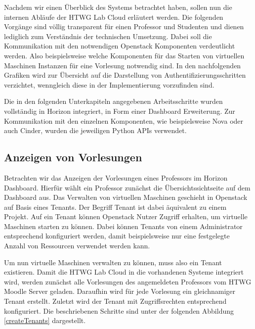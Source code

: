 Nachdem wir einen Überblick des Systems betrachtet haben, sollen nun 
die internen Abläufe der HTWG Lab Cloud erläutert werden. Die folgenden
Vorgänge sind völlig transparent für einen Professor und Studenten und dienen lediglich zum
Verständnis der technischen Umsetzung.
Dabei soll die Kommunikation mit den notwendigen Openstack Komponenten verdeutlicht werden.
Also beispielsweise welche Komponenten für das Starten von virtuellen Maschinen Instanzen 
für eine Vorlesung notwendig sind.
In den nachfolgenden Grafiken wird zur Übersicht auf die Darstellung von
Authentifizierungsschritten verzichtet, wenngleich diese in der Implementierung vorzufinden sind.

Die in den folgenden Unterkapiteln angegebenen Arbeitsschritte wurden vollständig in Horizon
integriert, in Form einer Dashboard Erweiterung.
Zur Kommunikation mit den einzelnen Komponenten, wie beispielsweise Nova oder auch Cinder, wurden
die jeweiligen Python APIs verwendet.






\newpage
\subsection{Anzeigen von Vorlesungen}
Betrachten wir das Anzeigen der Vorlesungen eines Professors im Horizon Dashboard.
Hierfür wählt ein Professor zunächst die Übersichtssichtseite auf dem Dashboard aus.
Das Verwalten von virtuellen Maschinen geschieht in Openstack auf Basis eines
Tenants. Der Begriff Tenant ist dabei äquivalent zu einem Projekt. 
Auf ein Tenant können Openstack Nutzer Zugriff erhalten, um virtuelle Maschinen starten
zu können. Dabei können Tenants von einem Administrator entsprechend konfiguriert werden, damit
beispielsweise nur eine festgelegte Anzahl von Ressourcen verwendet werden kann.

Um nun virtuelle Maschinen verwalten zu können, muss also ein Tenant existieren.
Damit die HTWG Lab Cloud in die vorhandenen Systeme integriert wird, werden zunächst
alle Vorlesungen des angemeldeten Professors vom HTWG Moodle Server geladen.
Daraufhin wird für jede Vorlesung ein gleichnamiger Tenant erstellt. Zuletzt wird der Tenant
mit Zugriffsrechten entsprechend konfiguriert. Die beschriebenen Schritte sind unter der folgenden
Abbildung \ref{createTenants} dargestellt.

